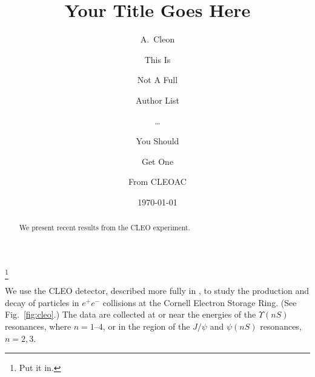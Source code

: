 \documentclass[aps,prl,twocolumn,superscriptaddress,showpacs]{revtex4}
\begin{document}

\title{Your Title Goes Here}


\author{A.~Cleon}

\author{This Is}
\author{Not A Full}
\author{Author List}
\author{\ldots}

\author{You Should}
\author{Get One}
\author{From CLEOAC}
\author{}
\thanks{Put it in.}

\noaffiliation


\date{\today}

\begin{abstract} 
We present recent results from the CLEO experiment.
\end{abstract}

\maketitle

We use the CLEO detector, described more fully in
\cite{Kubota:1992ww,Hill:1998ea}, to study the production and decay of
particles in $e^+e^-$ collisions at the Cornell Electron Storage Ring.
(See Fig.~\ref{fig:cleo}.)
The data are collected at or near the  energies of the $\Upsilon(nS)$
resonances, where $n=1$--$4$, or in the region of the $J/\psi$ and
$\psi(nS)$ resonances, $n=2,3$.
\end{document}
